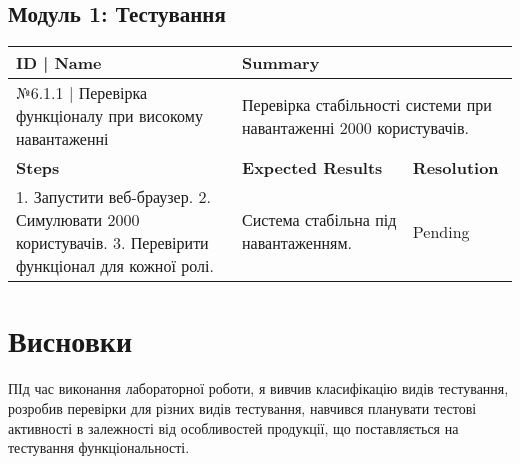 \documentclass[oneside,14pt]{extarticle}
\begin{document}
\begin{normalsize}
	\subsection*{Модуль 1: Тестування}
	\begin{longtable}{|p{7cm}|p{3.5cm}|p{3.5cm}|}
		\hline
		\textbf{ID | Name} & \multicolumn{2}{|p{7cm}|}{\textbf{Summary}}
		\\\hline
		№6.1.1 | Перевірка функціоналу при високому навантаженні & \multicolumn{2}{|p{7cm}|}{Перевірка стабільності системи при навантаженні 2000 користувачів.}
		\\\hline
		\textbf{Steps} & \textbf{Expected Results} & \textbf{Resolution}
		\\\hline
		1. Запустити веб-браузер. 2. Симулювати 2000 користувачів. 3. Перевірити функціонал для кожної ролі.
		& Система стабільна під навантаженням.
		& Pending
		\\\hline
	\end{longtable}
		
	\section*{Висновки}
	ПІд час виконання лабораторної роботи, я вивчив класифікацію видів тестування, розробив перевірки для різних видів тестування, навчився планувати тестові активності в залежності від особливостей продукції, що поставляється на тестування 	функціональності.
	    
\end{normalsize}
\end{document}
